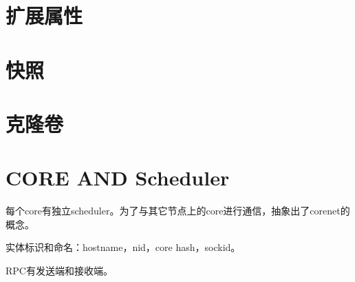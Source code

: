 \section{扩展属性}

\section{快照}

\section{克隆卷}

\section{CORE AND Scheduler}

每个core有独立scheduler。为了与其它节点上的core进行通信，抽象出了corenet的概念。

实体标识和命名：hostname，nid，core hash，sockid。

RPC有发送端和接收端。
